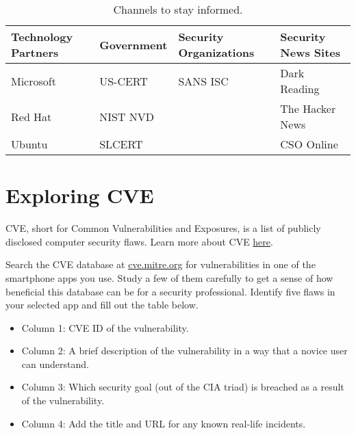 \documentclass[11pt,letterpaper]{article}
\begin{document}
\begin{table}[htbp]
    \caption{Channels to stay informed.
    }
    \begin{tabularx}{\columnwidth}{|X|X|X|X|}
        \hline
        \textbf{Technology Partners} & \textbf{Government}       & \textbf{Security Organizations} & \textbf{Security News Sites}  \\
        
        \hline
        Microsoft & 
        US-CERT & 
        SANS ISC &
        Dark Reading
        \\ \hline
        
        \hline
        Red Hat & 
        NIST NVD & 
        &
        The Hacker News
        \\ \hline
        
        \hline
        Ubuntu & 
        SLCERT &
        &
        CSO Online
        \\ \hline
    \end{tabularx}
\end{table}


\section*{Exploring CVE}
%

CVE, short for Common Vulnerabilities and Exposures, is a list of publicly disclosed computer security flaws. Learn more about CVE \href{https://www.redhat.com/en/topics/security/what-is-cve}{here}. 

Search the CVE database at \href{https://cve.mitre.org/}{cve.mitre.org} for vulnerabilities in one of the smartphone apps you use. Study a few of them carefully to get a sense of how beneficial this database can be for a security professional. Identify five flaws in your selected app and fill out the table below. 

\begin{itemize}
    \item Column 1: CVE ID of the vulnerability.
    \item Column 2: A brief description of the vulnerability in a way that a novice user can understand.
    \item Column 3: Which security goal (out of the CIA triad) is breached as a result of the vulnerability.
    \item Column 4: Add the title and URL for any known real-life incidents.
\end{itemize}
\end{document}
